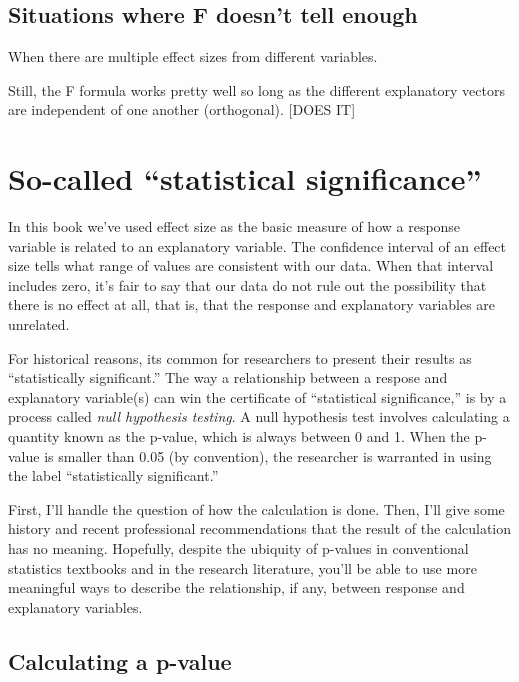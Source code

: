 \documentclass[]{tufte-book}
\begin{document}
\hypertarget{situations-where-f-doesnt-tell-enough}{%
\section{Situations where F doesn't tell enough}\label{situations-where-f-doesnt-tell-enough}}

When there are multiple effect sizes from different variables.

Still, the F formula works pretty well so long as the different explanatory vectors are independent of one another (orthogonal). {[}DOES IT{]}

\hypertarget{so-called-statistical-significance}{%
\chapter{So-called ``statistical significance''}\label{so-called-statistical-significance}}

In this book we've used effect size as the basic measure of how a response variable is related to an explanatory variable. The confidence interval of an effect size tells what range of values are consistent with our data. When that interval includes zero, it's fair to say that our data do not rule out the possibility that there is no effect at all, that is, that the response and explanatory variables are unrelated.

For historical reasons, its common for researchers to present their results as ``statistically significant.'' The way a relationship between a respose and explanatory variable(s) can win the certificate of ``statistical significance,'' is by a process called \emph{null hypothesis testing}. A null hypothesis test involves calculating a quantity known as the p-value, which is always between 0 and 1. When the p-value is smaller than 0.05 (by convention), the researcher is warranted in using the label ``statistically significant.''

First, I'll handle the question of how the calculation is done. Then, I'll give some history and recent professional recommendations that the result of the calculation has no meaning. Hopefully, despite the ubiquity of p-values in conventional statistics textbooks and in the research literature, you'll be able to use more meaningful ways to describe the relationship, if any, between response and explanatory variables.

\hypertarget{calculating-a-p-value}{%
\section{Calculating a p-value}\label{calculating-a-p-value}}
\end{document}
